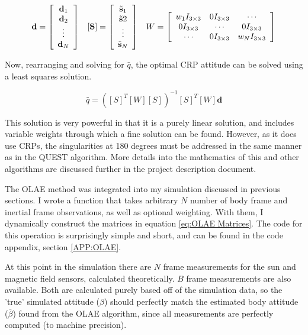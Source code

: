 \documentclass[11pt]{aiaa-tc}%
\newcommand{\brackets} [1] {\left[ #1 \right]}
\newcommand{\arrayb}[2]{\brackets{ \begin{array}{#1}  #2 \end{array} } }
\begin{document}
\begin{equation}
	\begin{array}{c c c}
		\textbf{d} = \arrayb{c}{\textbf{d}_1 \\ \textbf{d}_2 \\ \vdots \\ \textbf{d}_N}
		&
		[\textbf{S} ]= \arrayb{c}{\tilde{\textbf{s}}_1 \\ \tilde{\textbf{s}}2 \\ \vdots \\ \tilde{\textbf{s}}_N}
		&
		W = \arrayb{ccc}{w_1I_{3 \times 3} 	& 	0I_{3 \times 3}  	&	\cdots 			\\
					  0I_{3 \times 3}  	&	\cdots 		& 	 0I_{3 \times 3}  	\\
						\cdots 		&	 0I_{3 \times 3}  & 	w_NI_{3 \times 3}	}
	\end{array}
	\label{eq:OLAE Matrices}
\end{equation}


Now, rearranging and solving for $\bar{q}$, the optimal CRP attitude can be solved using a least squares solution. 

\begin{equation}
		\bar{q} = ( [S]^T [W] [S] ) ^{-1} [S]^T [W] \textbf{d}
		\label{eq:OLAE}
\end{equation}

This solution is very powerful in that it is a purely linear solution, and includes variable weights through which a fine solution can be found. However, as it does use CRPs, the singularities at 180 degrees must be addressed in the same manner as in the QUEST algorithm. More details into the mathematics of this and other algorithms are discussed further in the project description document\cite{5010ProjectDescription}. 

The OLAE method was integrated into my simulation discussed in previous sections. I wrote a function that takes arbitrary $N$ number of body frame and inertial frame observations, as well as optional weighting. With them, I dynamically construct the matrices in equation \ref{eq:OLAE Matrices}. The code for this operation is surprisingly simple and short, and can be found in the code appendix, section \ref{APP:OLAE}. 

At this point in the simulation there are $N$ frame measurements for the sun and magnetic field sensors, calculated theoretically. $B$ frame measurements are also available. Both are calculated purely based off of the simulation data, so the 'true' simulated attitude ($\beta$) should perfectly match the estimated body attitude ($\bar{\beta}$) found from the OLAE algorithm, since all measurements are perfectly computed (to machine precision). 
\end{document}
